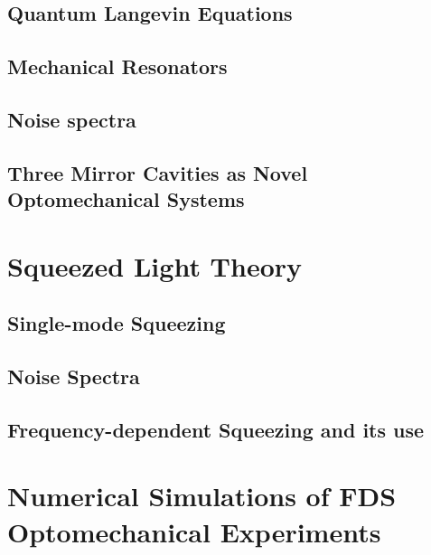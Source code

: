 \subsection{Quantum Langevin Equations}
\subsection{\color{red}Mechanical Resonators}
\subsection{Noise spectra}
\subsection{\color{red} Three Mirror Cavities as Novel Optomechanical Systems }
\hspace{1pt}

\section{Squeezed Light Theory}
\subsection{Single-mode Squeezing}
\subsection{Noise Spectra }
\subsection{Frequency-dependent Squeezing and its use}
\hspace{1pt}

\section{Numerical Simulations of FDS Optomechanical Experiments}

